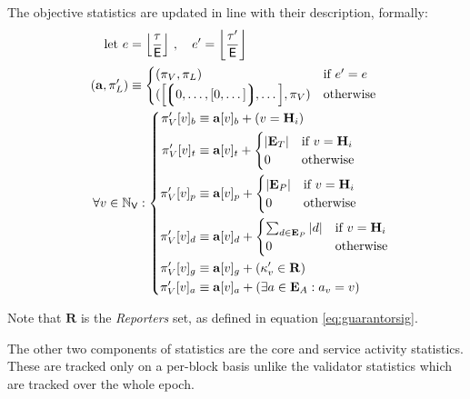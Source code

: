 
The objective statistics are updated in line with their description, formally:
\begin{align}
    \using e =\; &\ffrac{\tau}{\mathsf{E}} \ ,\quad e' = \ffrac{\tau'}{\mathsf{E}}\\
    (\mathbf{a}, \pi'_L) \equiv\;&\begin{cases}
        (\pi_V, \pi_L) &\when e' = e \\
        (\sq{\tuple{0, \dots, [0, \dots]}, \dots}, \pi_V) &\otherwise
    \end{cases}\\
    \forall v \in \N_\mathsf{V} :&\; \left\{\begin{aligned}
        \pi'_V[v]_b &\equiv \mathbf{a}[v]_b + (v = \mathbf{H}_i)\\
        \pi'_V[v]_t &\equiv \mathbf{a}[v]_t + \begin{cases}
            |\xttickets| &\when v = \mathbf{H}_i \\
            0 &\otherwise
        \end{cases}\\
        \pi'_V[v]_p &\equiv \mathbf{a}[v]_p + \begin{cases}
            |\xtpreimages| &\when v = \mathbf{H}_i \\
            0 &\otherwise
        \end{cases}\\
        \pi'_V[v]_d &\equiv \mathbf{a}[v]_d + \begin{cases}
            \sum_{d \in \xtpreimages}|d| &\when v = \mathbf{H}_i \\
            0 &\otherwise
        \end{cases}\\
        \pi'_V[v]_g &\equiv \mathbf{a}[v]_g + (\kappa'_v \in \mathbf{R})\\
        \pi'_V[v]_a &\equiv \mathbf{a}[v]_a + (\exists a \in \xtassurances : a_v = v)
    \end{aligned}\right.\!\!\!\!
\end{align}

Note that $\mathbf{R}$ is the \emph{Reporters} set, as defined in equation \ref{eq:guarantorsig}.

The other two components of statistics are the core and service activity statistics. These are tracked only on a per-block basis unlike the validator statistics which are tracked over the whole epoch.

